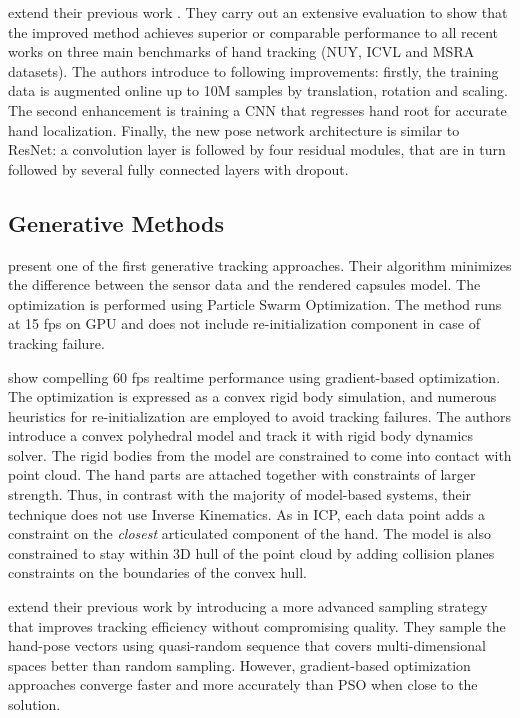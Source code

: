 \hspace{-0.4em}
\textbf{\cite{oberweger2017deepprior++}} 
extend their previous work \cite{oberweger2015hands}. They carry out an extensive evaluation to show that the improved method achieves superior or comparable performance to all recent works on three main benchmarks of hand tracking (NUY, ICVL and MSRA datasets). The authors introduce to following improvements: firstly, the training data is augmented online up to 10M samples by translation, rotation and scaling. The second enhancement is training a CNN that regresses hand root for accurate hand localization. Finally, the new pose network architecture is similar to ResNet: a convolution layer is followed by four residual modules, that are in turn followed by several fully connected layers with dropout.

\subsection{Generative Methods}

\hspace{-0.4em}
\textbf{\cite{oiko2011hand}} 
present one of the first generative tracking approaches. Their algorithm minimizes the difference between the sensor data and the rendered capsules model. The optimization is performed using Particle Swarm Optimization. The method runs at 15 fps on GPU and does not include re-initialization component in case of tracking failure.

\hspace{-0.4em}
\textbf{\cite{melax2013dynamics}} 
show compelling 60 fps realtime performance using gradient-based optimization. The optimization is expressed as a convex rigid body simulation, and numerous heuristics for re-initialization are employed to avoid tracking failures. The authors introduce a convex polyhedral model and track it with rigid body dynamics solver. The rigid bodies from the model are constrained to come into contact with point cloud. The hand parts are attached together with constraints of larger strength. Thus, in contrast with the majority of model-based systems, their technique does not use Inverse Kinematics. As in ICP, each data point adds a constraint on the \textit{closest} articulated component of the hand. The model is also constrained to stay within 3D hull of the point cloud by adding collision planes constraints on the boundaries of the convex hull.

\hspace{-0.4em}
\textbf{\cite{oikonomidis2014evolutionary}} 
extend their previous work \cite{oiko2011hand} by introducing a more advanced sampling strategy that improves tracking efficiency without compromising quality. They sample the hand-pose vectors using quasi-random sequence that covers multi-dimensional spaces better than random sampling. However, gradient-based optimization approaches converge faster and more accurately than PSO when close to the solution.

